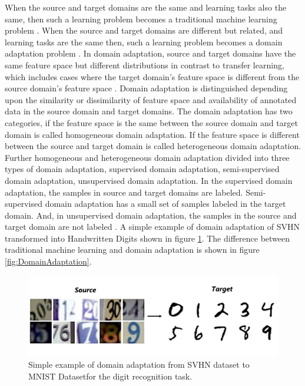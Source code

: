 When the source and target domains are the same and learning tasks also the same, then such a learning problem becomes a traditional machine learning problem \cite{5288526}. When the source and target domains are different but related, and learning tasks are the same then, such a learning problem becomes a domain adaptation problem \cite{5288526}. In domain adaptation, source and target domains have the same feature space but different distributions in contrast to transfer learning, which includes cases where the target domain's feature space is different from the source domain's feature space \cite{5288526}. Domain adaptation is distinguished depending upon the similarity or dissimilarity of feature space and availability of annotated data in the source domain and target domains. The domain adaptation has two categories, if the feature space is the same between the source domain and target domain is called homogeneous domain adaptation. If the feature space is different between the source and target domain is called heterogeneous domain adaptation. Further homogeneous and heterogeneous domain adaptation divided into three types of domain adaptation, supervised domain adaptation, semi-supervised domain adaptation, unsupervised domain adaptation. In the supervised domain adaptation, the samples in source and target domains are labeled. Semi-supervised domain adaptation has a small set of samples labeled in the target domain. And, in unsupervised domain adaptation, the samples in the source and target domain are not labeled \cite{5288526}. A simple example of domain adaptation of  \ac{SVHN} transformed into Handwritten Digits shown in figure \ref{fig:DA}. The difference between traditional machine learning and domain adaptation is shown in figure \ref{fig:DomainAdaptation}.


\begin{figure}[H]
        \begin{center}
 	    \includegraphics[scale=0.15]{images/Introduction/DA.png}
	    \caption[Simple example of domain adaptation from \ac{SVHN} dataset to \ac{MNIST} Dataset for the digit recognition task.]{Simple example of domain adaptation from \ac{SVHN} dataset \cite{37648} to \ac{MNIST} Dataset\footnotemark for the digit recognition task.\footnotemark}
	    \label{fig:DA}
	    \end{center}
\end{figure}





